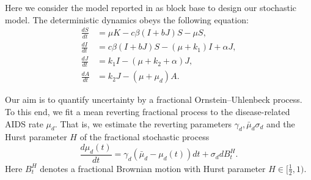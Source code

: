 Here we consider the model reported in \cite{Cai2009} as block base to
design our stochastic model. The deterministic dynamics obeys the following 
equation:
%
\begin{equation}
    \begin{aligned}
        \frac{dS}{dt} &=
            \mu K - c \beta (I + b J) S - \mu S,
            \\
        \frac{dI}{dt} &=
            c \beta (I + b J) S - (\mu + k_1)  I + \alpha J,
            \\
        \frac{dJ}{dt} &=
            k_1 I - (\mu + k_2 + \alpha) J,
            \\
        \frac{dA}{dt} &=
            k_2 J - (\mu + \mu_d) A.
    \end{aligned}
\end{equation}

Our aim is to quantify uncertainty by a fractional Ornstein–Uhlenbeck 
process. To this end, we fit a mean reverting fractional process to the 
disease-related AIDS rate $\mu_d$. That is, we estimate the reverting 
parameters $\gamma_d, \bar{\mu}_d 
\sigma_d$ and the Hurst parameter $H$ of the fractional stochastic process
\begin{equation}\label{eqn:fOU}
    \frac{d \mu_d(t)}{dt} = 
        \gamma_d \left( \bar{\mu}_d - \mu_d(t) \right) dt
        + \sigma_d dB_t^H.
\end{equation}
Here $B_t^H$ denotes a fractional Brownian motion with Hurst parameter
$H\in[\frac{1}{2}, 1)$.